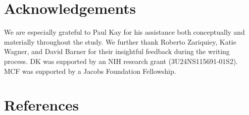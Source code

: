 \documentclass[
  ,apa7,floatsintext]{apa6}
\begin{document}
\hypertarget{acknowledgements}{%
\section{Acknowledgements}\label{acknowledgements}}

We are especially grateful to Paul Kay for his assistance both conceptually and materially throughout the study. We further thank Roberto Zariquiey, Katie Wagner, and David Barner for their insightful feedback during the writing process. DK was supported by an NIH research grant (3U24NS115691-01S2). MCF was supported by a Jacobs Foundation Fellowship.

\newpage

\hypertarget{references}{%
\section{References}\label{references}}

\begingroup
\setlength{\parindent}{-0.5in}
\setlength{\leftskip}{0.5in}
\end{document}

